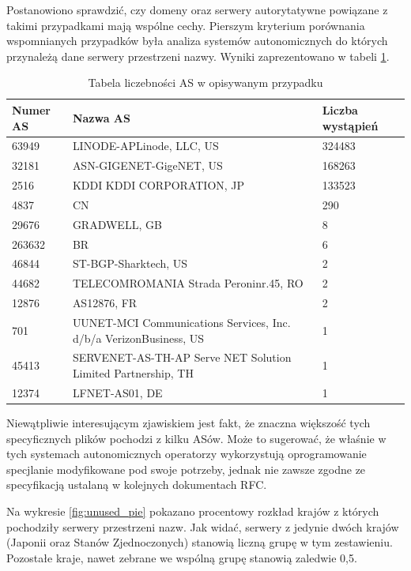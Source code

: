 Postanowiono sprawdzić, czy domeny oraz serwery autorytatywne powiązane z takimi przypadkami mają
wspólne cechy. Pierszym kryterium porównania wspomnianych przypadków była analiza systemów autonomicznych do których przynależą
dane serwery przestrzeni nazwy. Wyniki zaprezentowano w tabeli \ref{tab:unused}.
\begin{table}[!hb]
	\centering
	\caption{Tabela liczebności AS w opisywanym przypadku}
	\label{tab:unused}
	\begin{tabular}{|p{}|p{}|p{}|}
		\hline
		\textbf{Numer AS} &
		\textbf{Nazwa AS} &
		\textbf{Liczba wystąpień} \\
		\hline\hline
		63949 & LINODE-APLinode, LLC, US & 324483 \\
		\hline
		32181 & ASN-GIGENET-GigeNET, US & 168263 \\
		\hline
		2516 & KDDI KDDI CORPORATION, JP & 133523 \\
		\hline
		4837 &  CN & 290 \\
		\hline
		29676 & GRADWELL, GB & 8 \\
		\hline
		263632 & BR & 6 \\
		\hline
		46844 & ST-BGP-Sharktech, US & 2 \\
		\hline
		44682 & TELECOMROMANIA Strada Peroninr.45, RO & 2 \\
		\hline
		12876 & AS12876, FR & 2 \\
		\hline
		701 & UUNET-MCI Communications Services, Inc. d/b/a VerizonBusiness, US & 1 \\
		\hline
		45413 & SERVENET-AS-TH-AP Serve NET Solution Limited Partnership, TH & 1 \\
		\hline
		12374 & LFNET-AS01, DE & 1 \\
		\hline\hline
	\end{tabular}
\end{table}

Niewątpliwie interesującym zjawiskiem jest fakt, że znaczna większość tych specyficznych plików pochodzi z kilku ASów.
Może to sugerować, że właśnie w tych systemach autonomicznych operatorzy wykorzystują oprogramowanie specjlanie modyfikowane
pod swoje potrzeby, jednak nie zawsze zgodne ze specyfikacją ustalaną w kolejnych dokumentach RFC.

Na wykresie \ref{fig:unused_pie} pokazano procentowy rozkład krajów z których pochodziły serwery przestrzeni nazw. Jak widać,
serwery z jedynie dwóch krajów (Japonii oraz Stanów Zjednoczonych) stanowią liczną grupę w tym zestawieniu. Pozostałe kraje, nawet
zebrane we wspólną grupę stanowią zaledwie 0,5\textperthousand.

